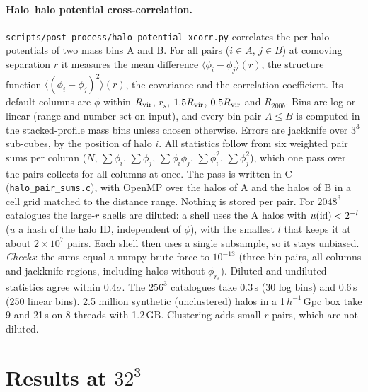 \documentclass[11pt,a4paper]{article}
\newcommand{\fp}[1]{\nolinkurl{#1}}
\begin{document}
\paragraph{Halo--halo potential cross-correlation.}
\label{sec:xcm}
\fp{scripts/post-process/halo_potential_xcorr.py} correlates the per-halo potentials of two mass bins A and B. For
all pairs ($i\in A$, $j\in B$) at comoving separation $r$ it measures the mean difference
$\langle\phi_i-\phi_j\rangle(r)$, the structure function $\langle(\phi_i-\phi_j)^2\rangle(r)$, the covariance and the
correlation coefficient. Its default columns are $\phi$ within $R_{\rm vir}$, $r_s$, $1.5R_{\rm vir}$,
$0.5R_{\rm vir}$ and $R_{200b}$. Bins are log or linear (range and number set on input), and every bin pair
$A\le B$ is computed in the stacked-profile mass bins unless chosen otherwise. Errors are jackknife over $3^3$
sub-cubes, by the position of halo $i$. All statistics follow from six weighted pair sums per column
($N$, $\sum\phi_i$, $\sum\phi_j$, $\sum\phi_i\phi_j$, $\sum\phi_i^2$, $\sum\phi_j^2$), which one pass over the
pairs collects for all columns at once. The pass is written in C (\fp{halo_pair_sums.c}), with OpenMP over the
halos of A and the halos of B in a cell grid matched to the distance range. Nothing is stored per pair.
For $2048^3$ catalogues the large-$r$ shells are diluted: a shell uses the A halos with $u({\rm id})<2^{-l}$ ($u$ a
hash of the halo ID, independent of $\phi$), with the smallest $l$ that keeps it at about $2\times10^7$ pairs.
Each shell then uses a single subsample, so it stays unbiased.
\emph{Checks}: the sums equal a numpy brute force to $10^{-13}$ (three bin pairs, all columns and jackknife regions,
including halos without $\phi_{r_s}$). Diluted and undiluted statistics agree within $0.4\sigma$.
The $256^3$ catalogues take 0.3\,s (30 log bins) and 0.6\,s (250 linear bins). 2.5 million synthetic
(unclustered) halos in a 1\,$h^{-1}$\,Gpc box take 9 and 21\,s on 8 threads with 1.2\,GB. Clustering adds
small-$r$ pairs, which are not diluted.

\section{Results at $32^3$}
\label{sec:r32}



\end{document}
